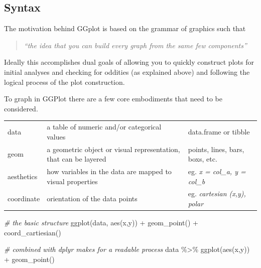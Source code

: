 \documentclass[
]{book}
\newenvironment{Shaded}{\begin{snugshade}}{\end{snugshade}}
\newcommand{\CommentTok}[1]{\textcolor[rgb]{0.56,0.35,0.01}{\textit{#1}}}
\newcommand{\FunctionTok}[1]{\textcolor[rgb]{0.00,0.00,0.00}{#1}}
\newcommand{\NormalTok}[1]{#1}
\newcommand{\SpecialCharTok}[1]{\textcolor[rgb]{0.00,0.00,0.00}{#1}}
\begin{document}
\hypertarget{syntax-1}{%
\subsection{Syntax}\label{syntax-1}}

The motivation behind GGplot is based on the grammar of graphics such that

\begin{quote}
\emph{``the idea that you can build every graph from the same few components''}
\end{quote}

Ideally this accomplishes dual goals of allowing you to quickly construct plots for initial analyses and checking for oddities (as explained above) and following the logical process of the plot construction.

To graph in GGPlot there are a few core embodiments that need to be considered.

\begin{longtable}[]{@{}
  >{\raggedright\arraybackslash}p{}
  >{\raggedright\arraybackslash}p{}
  >{\raggedright\arraybackslash}p{}@{}}
\toprule\noalign{}
\endhead
\bottomrule\noalign{}
\endlastfoot
data & a table of numeric and/or categorical values & data.frame or tibble \\
geom & a geometric object or visual representation, that can be layered & points, lines, bars, boxs, etc. \\
aesthetics & how variables in the data are mapped to visual properties & eg. \emph{x = col\_a, y = col\_b} \\
coordinate & orientation of the data points & eg. \emph{cartesian (x,y), polar} \\
\end{longtable}

\begin{Shaded}
\begin{Highlighting}[]
\CommentTok{\# the basic structure}
\FunctionTok{ggplot}\NormalTok{(data, }\FunctionTok{aes}\NormalTok{(x,y)) }\SpecialCharTok{+} \FunctionTok{geom\_point}\NormalTok{() }\SpecialCharTok{+} \FunctionTok{coord\_cartiesian}\NormalTok{()}

\CommentTok{\# combined with dplyr makes for a readable process}
\NormalTok{data }\SpecialCharTok{\%\textgreater{}\%} \FunctionTok{ggplot}\NormalTok{(}\FunctionTok{aes}\NormalTok{(x,y)) }\SpecialCharTok{+} \FunctionTok{geom\_point}\NormalTok{()}
\end{Highlighting}
\end{Shaded}
\end{document}
